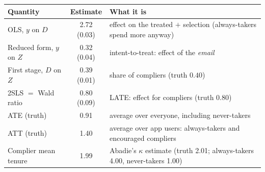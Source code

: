 \begin{tabular}{lcl}\toprule
Quantity & Estimate & What it is \\ \midrule
OLS, $y$ on $D$ & 2.72 (0.03) & effect on the treated $+$ selection (always-takers spend more anyway) \\
Reduced form, $y$ on $Z$ & 0.32 (0.04) & intent-to-treat: effect of the \emph{email} \\
First stage, $D$ on $Z$ & 0.39 (0.01) & share of compliers (truth $0.40$) \\
2SLS $=$ Wald ratio & 0.80 (0.09) & LATE: effect for compliers (truth $0.80$) \\
ATE (truth) & 0.91 & average over everyone, including never-takers \\
ATT (truth) & 1.40 & average over app users: always-takers and encouraged compliers \\
Complier mean tenure & 1.99 & Abadie's $\kappa$ estimate (truth 2.01; always-takers 4.00, never-takers 1.00) \\
\bottomrule\end{tabular}
